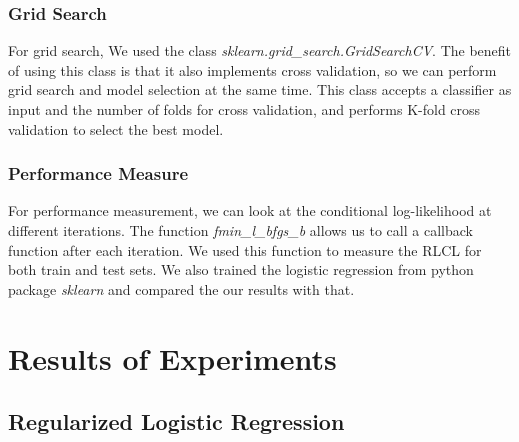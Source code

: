 \documentclass[twoside,12pt]{article}
\begin{document}
\subsubsection{Grid Search}
For grid search, We used the class {\it sklearn.grid\_search.GridSearchCV}. The benefit of using this class is that it also implements cross validation, so we can perform grid search and model selection at the same time. This class accepts a classifier as input and the number of folds for cross validation, and performs K-fold cross validation to select the best model.
\subsubsection{Performance Measure}
For performance measurement, we can look at the conditional log-likelihood at different iterations. The function {\it fmin\_l\_bfgs\_b} allows us to call a callback function after each iteration. We used this function to measure the RLCL for both train and test sets. We also trained the logistic regression from python package {\it sklearn} and compared the our results with that.
\section{Results of Experiments}
\subsection{Regularized Logistic Regression}
\end{document}
